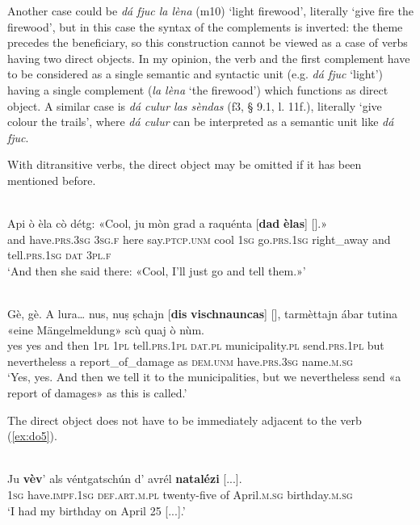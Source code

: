 Another case could be \textit{dá fjuc la lèna} (m10) `light firewood', literally `give fire the firewood', but in this case the syntax of the complements is inverted: the theme precedes the beneficiary, so this construction cannot be viewed as a case of verbs having two direct objects. In my opinion, the verb and the first complement have to be considered as a single semantic and syntactic unit (e.g. \textit{dá fjuc} `light') having a single complement (\textit{la lèna} `the firewood') which functions as direct object. A similar case is \textit{dá culur las sèndas} (f3, § 9.1, l. 11f.), literally `give colour the trails', where \textit{dá culur} can be interpreted as a semantic unit like \textit{dá fjuc}.

With ditransitive verbs, the direct object may be omitted if it has been mentioned before.

\ea\label{}
\\
\gll    Api ò èla cò détg: «Cool, ju mòn grad a raquénta [\textbf{dad} \textbf{èlas}] [\textbf{{\longrule}}].»\\
and have.\textsc{prs.3sg} \textsc{3sg.f} here say.\textsc{ptcp.unm} cool \textsc{1sg}  go.\textsc{prs.1sg} right\_away and tell.\textsc{prs.1sg} \textsc{dat} \textsc{3pl.f} {}\\
\glt `And then she said there: «Cool, I’ll just go and tell them.»'
\z

\ea\label{}
\\
\gll  Gè, gè. A lura… nus, nuṣ ṣchajn [\textbf{dis} \textbf{vischnauncas}] [\textbf{{\longrule}}], tarmèttajn ábar tutina «eine Mängelmeldung»\footnotemark{} scù quaj ò nùm.  \\
yes yes and then \textsc{1pl} \textsc{1pl} tell.\textsc{prs.1pl} \textsc{dat.pl} municipality.\textsc{pl} {} send.\textsc{prs.1pl} but nevertheless a report\_of\_damage as \textsc{dem.unm} have.\textsc{prs.3sg} name.\textsc{m.sg}\\
\glt `Yes, yes. And then we tell it to the municipalities, but we nevertheless send «a report of damages» as this is called.'
\z

The direct object does not have to be immediately adjacent to the verb (\ref{ex:do5}).

\ea
\label{ex:do5}
\\
	\gll Ju \textbf{vèv}’ als véntgatschún d’ avrél \textbf{natalézi} [...].   \\
\textsc{1sg} have.\textsc{impf.1sg} \textsc{def.art.m.pl} twenty-five of April.\textsc{m.sg} birthday.\textsc{m.sg} \\
\glt `I had my birthday on April 25 [...].'
\z



